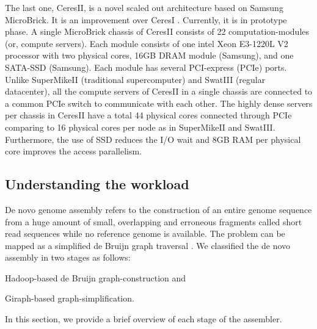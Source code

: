 \documentclass[conference]{IEEEtran}
\begin{document}
The last one, CeresII, is a novel scaled out architecture based on Samsung MicroBrick. It is an improvement over CeresI \cite{Cluster:ceres1}. Currently, it is in prototype phase.  
A single MicroBrick chassis of CeresII consists of 22 computation-modules (or, compute servers). Each module consists of one intel Xeon E3-1220L V2 processor with two physical cores, 16GB DRAM module (Samsung), and  one SATA-SSD (Samsung). Each module has several PCI-express (PCIe) ports.  Unlike SuperMikeII (traditional supercomputer) and SwatIII (regular datacenter), all the compute servers of CeresII in a single chassis are connected to a common PCIe switch to communicate with each other. The highly dense servers per chassis in CeresII have a total 44 physical cores connected through PCIe comparing to 16 physical cores per node as in SuperMikeII and SwatIII. Furthermore, the use of SSD reduces the I/O wait and 8GB RAM per physical core improves the access parallelism.

\subsection {Understanding the workload} \label{TheWorkload}
De novo genome assembly refers to the construction of an entire genome sequence from a huge amount of small, overlapping and erroneous fragments called short read sequences while no reference genome is available. The problem can be mapped as a simplified de Bruijn graph traversal \cite{bio:debruijngraph}. We classified the de novo assembly in two stages as follows:
\begin{inparaenum}
\item Hadoop-based de Bruijn graph-construction and
\item Giraph-based graph-simplification.  
\end{inparaenum}
In this section, we provide a brief overview of each stage of the assembler. 
\end{document}
